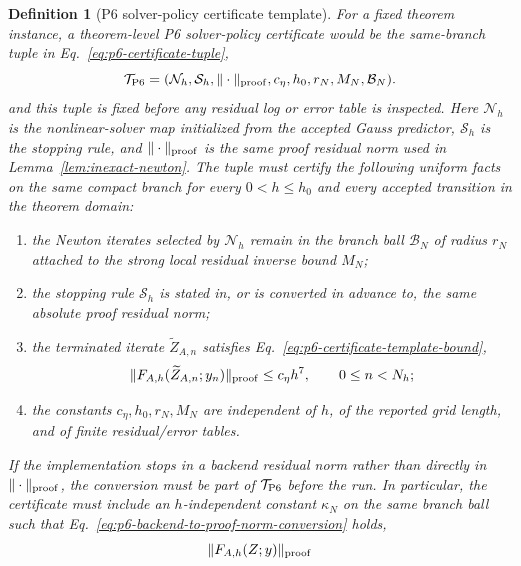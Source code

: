 \documentclass[preprint,12pt]{elsarticle}
\newtheorem{definition}{Definition}
\begin{document}
\begin{definition}[P6 solver-policy certificate template]
\label{def:p6-solver-policy-certificate-template}
For a fixed theorem instance, a theorem-level P6 solver-policy certificate
would be the same-branch tuple in Eq.~\eqref{eq:p6-certificate-tuple},
\begin{equation}
\label{eq:p6-certificate-tuple}
  \mathcal T_{\rm P6}
  =(\mathcal N_h,\mathcal S_h,\|\cdot\|_{\rm proof},c_\eta,h_0,
    r_N,M_N,\mathcal B_N).
\end{equation}
and this tuple is fixed before any residual log or error table is inspected.  Here
\(\mathcal N_h\) is the nonlinear-solver map initialized from the accepted
Gauss predictor, \(\mathcal S_h\) is the stopping rule, and
\(\|\cdot\|_{\rm proof}\) is the same proof residual norm used in
Lemma~\ref{lem:inexact-newton}.  The tuple must certify the following
uniform facts on the same compact branch for every \(0<h\le h_0\) and every
accepted transition in the theorem domain:
\begin{enumerate}
  \item the Newton iterates selected by \(\mathcal N_h\) remain in the
  branch ball \(\mathcal B_N\) of radius \(r_N\) attached to the strong local
  residual inverse bound \(M_N\);
  \item the stopping rule \(\mathcal S_h\) is stated in, or is converted in
  advance to, the same absolute proof residual norm;
  \item the terminated iterate \(\widetilde Z_{A,n}\) satisfies
  Eq.~\eqref{eq:p6-certificate-template-bound},
  \begin{equation}
  \label{eq:p6-certificate-template-bound}
    \|F_{A,h}(\widetilde Z_{A,n};y_n)\|_{\rm proof}
    \le c_\eta h^7,\qquad 0\le n<N_h ;
  \end{equation}
  \item the constants \(c_\eta,h_0,r_N,M_N\) are independent of \(h\), of the
  reported grid length, and of finite residual/error tables.
\end{enumerate}
If the implementation stops in a backend residual norm rather than directly in
\(\|\cdot\|_{\rm proof}\), the conversion must be part of
\(\mathcal T_{\rm P6}\) before the run.  In particular, the certificate must
include an \(h\)-independent constant \(\kappa_N\) on the same branch ball
such that Eq.~\eqref{eq:p6-backend-to-proof-norm-conversion} holds,
\begin{equation}
\label{eq:p6-backend-to-proof-norm-conversion}
  \|F_{A,h}(Z;y)\|_{\rm proof}

\end{equation}
\end{definition}
\end{document}
